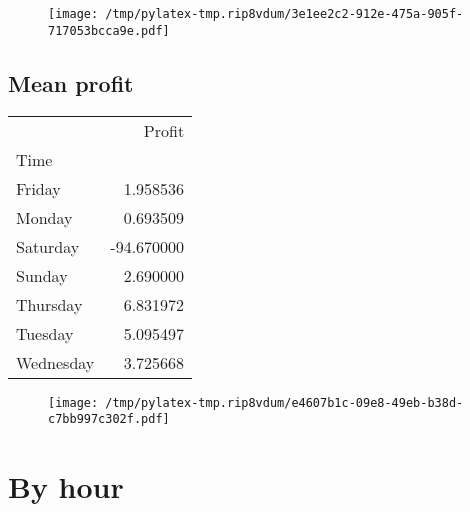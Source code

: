\documentclass{article}%
\begin{document}
\begin{figure}[htbp]%
\centering%
\texttt{[image: /tmp/pylatex-tmp.rip8vdum/3e1ee2c2-912e-475a-905f-717053bcca9e.pdf]}%
\end{figure}

%
\newpage %
\subsection{Mean profit }%
\label{subsec:Meanprofit}%
\begin{tabular}{lr}
\toprule
{} &     Profit \\
Time      &            \\
\midrule
Friday    &   1.958536 \\
Monday    &   0.693509 \\
Saturday  & -94.670000 \\
Sunday    &   2.690000 \\
Thursday  &   6.831972 \\
Tuesday   &   5.095497 \\
Wednesday &   3.725668 \\
\bottomrule
\end{tabular}
%


\begin{figure}[htbp]%
\centering%
\texttt{[image: /tmp/pylatex-tmp.rip8vdum/e4607b1c-09e8-49eb-b38d-c7bb997c302f.pdf]}%
\end{figure}

%
\newpage %
\section{By hour}%
\label{sec:Byhour}%
\end{document}
